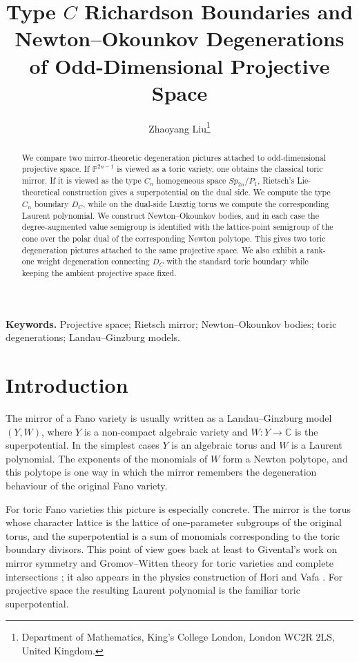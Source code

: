\documentclass{article}
\newcommand{\CC}{\mathbb{C}}
\newcommand{\PP}{\mathbb{P}}
\begin{document}
\title{Type \(C\) Richardson Boundaries and Newton--Okounkov Degenerations of Odd-Dimensional Projective Space}
\author{Zhaoyang Liu\thanks{Department of Mathematics, King's College London, London WC2R 2LS, United Kingdom.}}
\date{}
\maketitle

\begin{abstract}
We compare two mirror-theoretic degeneration pictures attached to odd-dimensional projective space. If \(\PP^{2n-1}\) is viewed as a toric variety, one obtains the classical toric mirror. If it is viewed as the type \(C_n\) homogeneous space \(Sp_{2n}/P_1\), Rietsch's Lie-theoretical construction gives a superpotential on the dual side. We compute the type \(C_n\) boundary \(D_C\), while on the dual-side Lusztig torus we compute the corresponding Laurent polynomial. We construct Newton--Okounkov bodies, and in each case the degree-augmented value semigroup is identified with the lattice-point semigroup of the cone over the polar dual of the corresponding Newton polytope. This gives two toric degeneration pictures attached to the same projective space. We also exhibit a rank-one weight degeneration connecting \(D_C\) with the standard toric boundary while keeping the ambient projective space fixed.
\end{abstract}

\smallskip
\noindent\textbf{Keywords.} Projective space; Rietsch mirror; Newton--Okounkov bodies; toric degenerations; Landau--Ginzburg models.

\section{Introduction}

The mirror of a Fano variety is usually written as a Landau--Ginzburg model \((Y,W)\), where \(Y\) is a non-compact algebraic variety and \(W:Y\to\CC\) is the superpotential. In the simplest cases \(Y\) is an algebraic torus and \(W\) is a Laurent polynomial. The exponents of the monomials of \(W\) form a Newton polytope, and this polytope is one way in which the mirror remembers the degeneration behaviour of the original Fano variety.

For toric Fano varieties this picture is especially concrete. The mirror is the torus whose character lattice is the lattice of one-parameter subgroups of the original torus, and the superpotential is a sum of monomials corresponding to the toric boundary divisors. This point of view goes back at least to Givental's work on mirror symmetry and Gromov--Witten theory for toric varieties and complete intersections \cite{Givental,Givental98}; it also appears in the physics construction of Hori and Vafa \cite{HV}. For projective space the resulting Laurent polynomial is the familiar toric superpotential.
\end{document}
